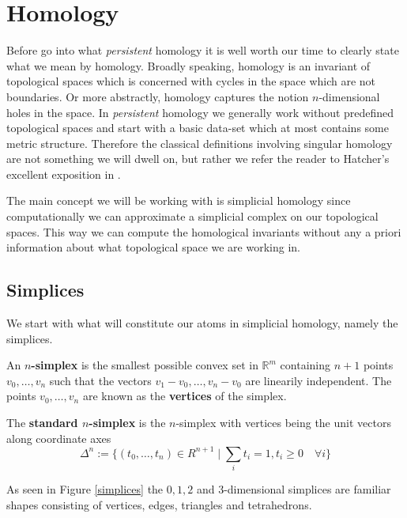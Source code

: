 \chapter{Homology}
Before go into what \textit{persistent} homology it is well worth our time to clearly state what we mean by homology. Broadly speaking, homology is an invariant of topological spaces which is concerned with cycles in the space which are not boundaries. Or more abstractly, homology captures the notion $n$-dimensional holes in the space. In \textit{persistent} homology we generally work without predefined topological spaces and start with a basic data-set which at most contains some metric structure. Therefore the classical definitions involving singular homology are not something we will dwell on, but rather we refer the reader to Hatcher's excellent exposition in \cite{hatcher2002}.

The main concept we will be working with is simplicial homology since computationally we can approximate a simplicial complex on our topological spaces. This way we can compute the homological invariants without any a priori information about what topological space we are working in.

\section{Simplices}
We start with what will constitute our atoms in simplicial homology, namely the simplices.
\begin{definition}
An \textbf{$n$-simplex} is the smallest possible convex set in $\mathbb{R}^{m}$ containing $n+1$ points $v_{0},\dots,v_{n}$ such that the vectors $v_{1}-v_{0}, \dots, v_{n} - v_{0}$ are linearily independent. The points $v_{0},\dots,v_{n}$ are known as the \textbf{vertices} of the simplex.
\end{definition}
\begin{definition}
The \textbf{standard $n$-simplex} is the $n$-simplex with vertices being the unit vectors along coordinate axes
\[ \Delta^{n} := \{ (t_{0}, \dots, t_{n}) \in R^{n+1} \mid \sum_{i} t_{i} = 1, t_{i} \geq 0 \quad \forall i \}
\]
\end{definition}
As seen in Figure \ref{simplices} the $0,1,2$ and $3$-dimensional simplices are familiar shapes consisting of vertices, edges, triangles and tetrahedrons.

